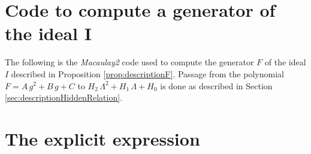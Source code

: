 \documentclass[phd,tocprelim]{cornell}
\begin{document}
\section{Code to compute a generator of the ideal I}

The following is the \textit{Macaulay2} \cite{Macaulay2} code used to compute the generator $F$ of the ideal $I$ described in Proposition \ref{prop:descriptionF}. Passage from the polynomial $F=A\,g^2+B\,g+C$ to $H_2\,\Lambda^2+H_1\,\Lambda+H_0$ is done as described in Section \ref{sec:descriptionHiddenRelation}. 

\bigskip



\section{The explicit expression}











% 
\end{document}
